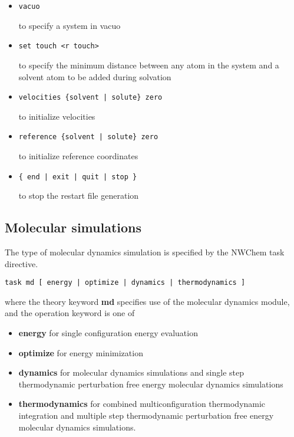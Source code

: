 \begin{itemize}
\item
\begin{verbatim}
vacuo
\end{verbatim}
to specify a system in vacuo

\item
\begin{verbatim}
set touch <r touch>
\end{verbatim}
to specify the minimum distance between any atom in
the system and a solvent atom to be added during solvation

\item
\begin{verbatim}
velocities {solvent | solute} zero
\end{verbatim}
to initialize velocities

\item
\begin{verbatim}
reference {solvent | solute} zero
\end{verbatim}
to initialize reference coordinates

\item
\begin{verbatim}
{ end | exit | quit | stop }
\end{verbatim}
to stop the restart file generation
\end{itemize}
\subsection{Molecular simulations}
The type of molecular dynamics simulation is specified by the
NWChem task directive.
\begin{verbatim}
task md [ energy | optimize | dynamics | thermodynamics ]
\end{verbatim}
where the theory keyword {\bf md} specifies use of the molecular
dynamics module, and the operation keyword is one of
\begin{itemize}
\item
{\bf energy} for single configuration energy evaluation
\item
{\bf optimize} for energy minimization
\item
{\bf dynamics} for molecular dynamics simulations and single step
thermodynamic perturbation free energy molecular dynamics simulations
\item
{\bf thermodynamics} for combined multiconfiguration thermodynamic
integration and multiple step thermodynamic perturbation free
energy molecular dynamics simulations.
\end{itemize}
